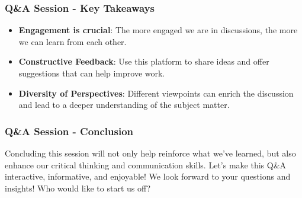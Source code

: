 \documentclass[aspectratio=169]{beamer}
\begin{document}
\begin{frame}[fragile]
  \frametitle{Q\&A Session - Key Takeaways}
  \begin{itemize}
    \item \textbf{Engagement is crucial}: The more engaged we are in discussions, the more we can learn from each other.
    \item \textbf{Constructive Feedback}: Use this platform to share ideas and offer suggestions that can help improve work.
    \item \textbf{Diversity of Perspectives}: Different viewpoints can enrich the discussion and lead to a deeper understanding of the subject matter.
  \end{itemize}
\end{frame}

\begin{frame}[fragile]
  \frametitle{Q\&A Session - Conclusion}
  Concluding this session will not only help reinforce what we've learned, but also enhance our critical thinking and communication skills. Let's make this Q\&A interactive, informative, and enjoyable! We look forward to your questions and insights! Who would like to start us off?
\end{frame}
\end{document}
